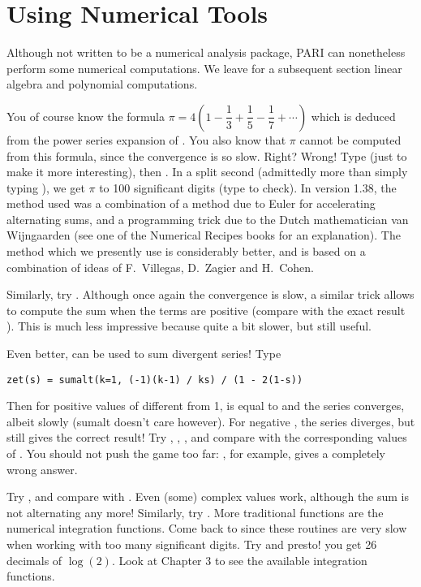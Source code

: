 \section{Using Numerical Tools}

 Although not written to be a numerical analysis package, PARI can
nonetheless perform some numerical computations. We leave for a subsequent
section linear algebra and polynomial computations.

You of course know the formula $\pi = 4(1-\dfrac13+\dfrac15-\dfrac17+\cdots)$
which is deduced from the power series expansion of . You also
know that $\pi$ cannot be computed from this formula, since the convergence
is so slow. Right? Wrong! Type  (just to make it more
interesting), then . In a split
second (admittedly more than simply typing ), we get $\pi$ to 100
significant digits (type  to check). In version 1.38, the method used
was a combination of a method due to Euler for accelerating alternating sums,
and a programming trick due to the Dutch mathematician van Wijngaarden (see
one of the Numerical Recipes books for an explanation). The method which we
presently use is considerably better, and is based on a combination of ideas of
F.~Villegas, D.~Zagier and H.~Cohen.

Similarly, try . Although once again the
convergence is slow, a similar trick allows to compute the sum when the terms
are positive (compare with the exact result ). This is much
less impressive because quite a bit slower, but still useful.

Even better,  can be used to sum divergent series! Type

\centerline{\tt zet(s) = sumalt(k=1, (-1)\pow(k-1) / k\pow s) / (1 - 2\pow(1-s))}

Then for positive values of  different from 1,  is equal
to  and the series converges, albeit slowly (sumalt doesn't
care however). For negative , the series diverges, but 
still gives the correct result! Try , ,
, and compare with the corresponding values of .
You should not push the game too far: , for example,
gives a completely wrong answer.

Try , and compare with . Even (some) complex values
work, although the sum is not alternating any more! Similarly, try
.
\medskip
%
More traditional functions are the numerical integration functions.
Come back to  since these routines are very slow when working
with too many significant digits. Try 
and presto! you get 26 decimals of $\log(2)$. Look at Chapter 3 to see the
available integration functions.

